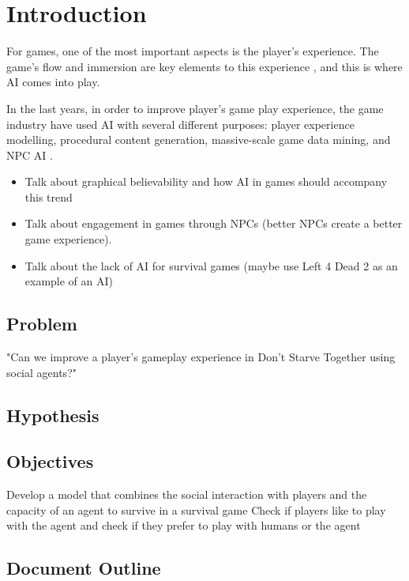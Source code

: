 \section{Introduction}

For games, one of the most important aspects is the player's experience.
The game's flow and immersion are key elements to this experience \cite{ijsselsteijn:userexperience}, and this is where \ac{AI} comes into play.

In the last years, in order to improve player's game play experience, the game industry have used \ac{AI} with several different purposes: player experience modelling, procedural content generation, massive-scale game data mining, and \ac{NPC} \ac{AI} \cite{yannakakis:gameairevisited}.

\begin{itemize}
	\item Talk about graphical believability and how AI in games should accompany this trend
	\item Talk about engagement in games through NPCs (better NPCs create a better game experience).
	\item Talk about the lack of AI for survival games (maybe use Left 4 Dead 2 as an example of an AI)
\end{itemize}

\subsection{Problem}
"Can we improve a player's gameplay experience in Don't Starve Together using social agents?"

\subsection{Hypothesis}


\subsection{Objectives}
Develop a model that combines the social interaction with players and the capacity of an agent to survive in a survival game
Check if players like to play with the agent
and check if they prefer to play with humans or the agent

\subsection{Document Outline}